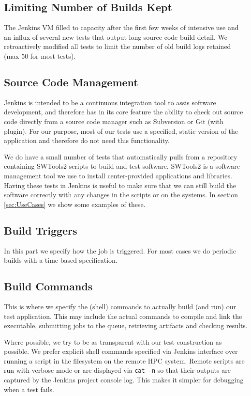 \documentclass[10pt, conference, compsocconf]{IEEEtran}
\begin{document}
\subsection{Limiting Number of Builds Kept}
The Jenkins VM filled to capacity after the first few weeks of intensive use and an influx of several new tests that output long source code build detail.
We retroactively modified all tests to limit the number of old build logs retained (max 50 for most tests). 

\subsection{Source Code Management}
Jenkins is intended to be a continuous integration tool to assis software development, and therefore has in its core feature the ability to check out source code directly from a source code manager such as Subversion or Git (with plugin).
For our purpose, most of our tests use a specified, static version of the application and therefore do not need this functionality. 

We do have a small number of tests that automatically pulls from a repository containing SWTools2 scripts to build and test software. 
SWTools2 is a software management tool we use to install center-provided applications and libraries. Having these tests in Jenkins is useful to make sure that we can still build the software correctly with any changes in the scripts or on the systems. 
In section \ref{sec:UseCases} we show some examples of these.

\subsection{Build Triggers}
In this part we specify how the job is triggered. 
For most cases we do periodic builds with a time-based specification.

\subsection{Build Commands}
This is where we specify the (shell) commands to actually build (and run) our test application. 
This may include the actual commands to compile and link the executable, submitting jobs to the queue, retrieving artifacts and checking results.

Where possible, we try to be as transparent with our test construction as possible. 
We prefer explicit shell commands specified via Jenkins interface over running a script in the filesystem on the remote HPC system. 
Remote scripts are run with verbose mode or are displayed via \texttt{cat -n} so that their outputs are captured by the Jenkins project console log. 
This makes it simpler for debugging when a test fails.
\end{document}
